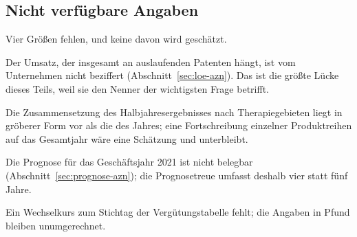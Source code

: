 
\subsection{Nicht verf\"ugbare Angaben}

Vier Gr\"o{\ss}en fehlen, und keine davon wird gesch\"atzt.

Der Umsatz, der insgesamt an auslaufenden Patenten h\"angt, ist vom
Unternehmen nicht beziffert (Abschnitt~\ref{sec:loe-azn}). Das ist die
gr\"o{\ss}te L\"ucke dieses Teils, weil sie den Nenner der wichtigsten Frage
betrifft.

Die Zusammensetzung des Halbjahresergebnisses nach Therapiegebieten liegt in
gr\"oberer Form vor als die des Jahres; eine Fortschreibung einzelner
Produktreihen auf das Gesamtjahr w\"are eine Sch\"atzung und unterbleibt.

Die Prognose f\"ur das Gesch\"aftsjahr 2021 ist nicht belegbar
(Abschnitt~\ref{sec:prognose-azn}); die Prognosetreue umfasst deshalb vier
statt f\"unf Jahre.

Ein Wechselkurs zum Stichtag der Verg\"utungstabelle fehlt; die Angaben in
Pfund bleiben unumgerechnet.
